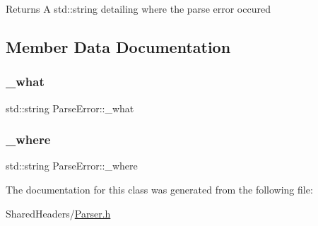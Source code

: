 \begin{DoxyReturn}{Returns}
A std\+::string detailing where the parse error occured 
\end{DoxyReturn}


\subsection{Member Data Documentation}
\mbox{\label{class_parse_error_a72a23d010120721cde37f0e3203ef12b}} 
\subsubsection{\texorpdfstring{\+\_\+what}{\_what}}
{\footnotesize\ttfamily std\+::string Parse\+Error\+::\+\_\+what\hspace{0.3cm}{\ttfamily [private]}}

\mbox{\label{class_parse_error_a3a27d02d5a9f461858cefd653a2c4598}} 
\subsubsection{\texorpdfstring{\+\_\+where}{\_where}}
{\footnotesize\ttfamily std\+::string Parse\+Error\+::\+\_\+where\hspace{0.3cm}{\ttfamily [private]}}



The documentation for this class was generated from the following file\+:\begin{DoxyCompactItemize}
\item 
Shared\+Headers/\mbox{\hyperlink{_parser_8h}{Parser.\+h}}\end{DoxyCompactItemize}
